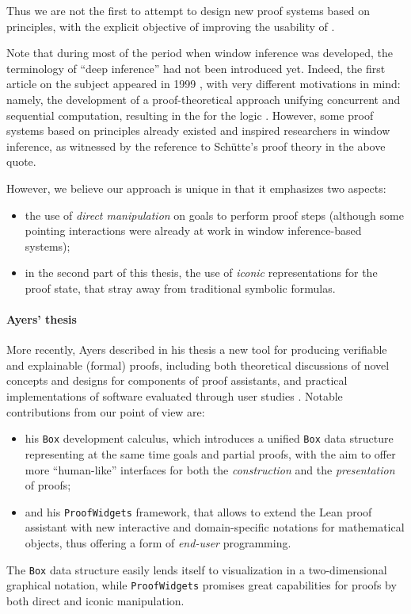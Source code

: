 Thus we are not the first to attempt to design new proof systems based on  principles, with the explicit objective of improving the usability of
.
\begin{digression}
  Note that during most of the period when window inference was developed, the
terminology of ``deep inference'' had not been introduced yet. Indeed, the first
article on the subject appeared in 1999 \cite{Guglielmi1999ACO}, with very
different motivations in mind: namely, the development of a proof-theoretical
approach unifying concurrent and sequential computation, resulting in the
 for the logic . However, some proof systems based
on  principles already existed and inspired researchers in window
inference, as witnessed by the reference to Schütte's proof theory in the above
quote.
\end{digression}
However, we believe our approach is unique in that it emphasizes two aspects:
\begin{itemize}
  \item the use of \emph{direct manipulation} on goals to perform proof steps
  (although some pointing interactions were already at work in window
  inference-based systems);
  \item in the second part of this thesis, the use of \emph{iconic}
  representations for the proof state, that stray away from traditional symbolic
  formulas.
\end{itemize}

\paragraph{Ayers' thesis}

More recently, Ayers described in his thesis a new tool for producing verifiable
and explainable (formal) proofs, including both theoretical discussions of novel
concepts and designs for components of proof assistants, and practical
implementations of software evaluated through user studies
. Notable contributions from our point of view are:
\begin{itemize}
  \item his \texttt{Box} development calculus, which introduces a unified
\texttt{Box} data structure representing at the same time goals and partial
proofs, with the aim to offer more ``human-like'' interfaces for both the
\emph{construction} and the \emph{presentation} of proofs;
  \item and his \texttt{ProofWidgets} framework, that allows to extend the Lean
proof assistant with new interactive and domain-specific notations for
mathematical objects, thus offering a form of \emph{end-user} programming.
\end{itemize}
The \texttt{Box} data structure easily lends itself to visualization in a
two-dimensional graphical notation, while \texttt{ProofWidgets} promises great
capabilities for proofs by both direct and iconic manipulation.

